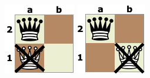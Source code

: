 \documentclass[12pt]{article}
\begin{document}
\begin{figure}[h]
\begin{minipage}{0.2\textwidth}
    \end{minipage}
    
    \vspace{0.5cm} %
    
    \begin{minipage}{0.2\textwidth}
        \centering
        \includegraphics[width=\textwidth]{Fig3.png}
    \end{minipage}
    \hspace{0.05\textwidth} %
    \begin{minipage}{0.2\textwidth}
        \centering
        \includegraphics[width=\textwidth]{Fig4.png}

\end{minipage}
\end{figure}
\end{document}
